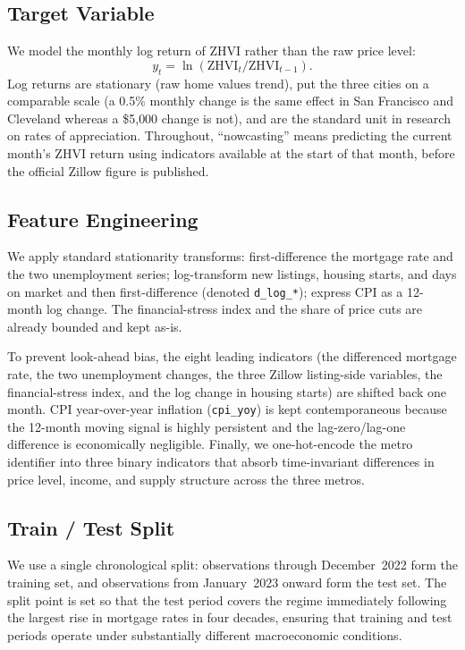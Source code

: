 \documentclass[12pt]{article}
\begin{document}
\subsection{Target Variable}

We model the monthly log return of ZHVI rather than the raw price level:
$$y_t = \ln\!\left(\text{ZHVI}_t / \text{ZHVI}_{t-1}\right).$$
Log returns are stationary (raw home values trend), put the three cities on a comparable scale (a 0.5\% monthly change is the same effect in San Francisco and Cleveland whereas a \$5{,}000 change is not), and are the standard unit in research on rates of appreciation. Throughout, ``nowcasting'' means predicting the current month's ZHVI return using indicators available at the start of that month, before the official Zillow figure is published.

\subsection{Feature Engineering}

We apply standard stationarity transforms: first-difference the mortgage rate and the two unemployment series; log-transform new listings, housing starts, and days on market and then first-difference (denoted \texttt{d\_log\_*}); express CPI as a 12-month log change. The financial-stress index and the share of price cuts are already bounded and kept as-is.

To prevent look-ahead bias, the eight leading indicators (the differenced mortgage rate, the two unemployment changes, the three Zillow listing-side variables, the financial-stress index, and the log change in housing starts) are shifted back one month. CPI year-over-year inflation (\texttt{cpi\_yoy}) is kept contemporaneous because the 12-month moving signal is highly persistent and the lag-zero/lag-one difference is economically negligible. Finally, we one-hot-encode the metro identifier into three binary indicators that absorb time-invariant differences in price level, income, and supply structure across the three metros.

\subsection{Train / Test Split}

We use a single chronological split: observations through December~2022 form the training set, and observations from January~2023 onward form the test set. The split point is set so that the test period covers the regime immediately following the largest rise in mortgage rates in four decades, ensuring that training and test periods operate under substantially different macroeconomic conditions.
\end{document}
